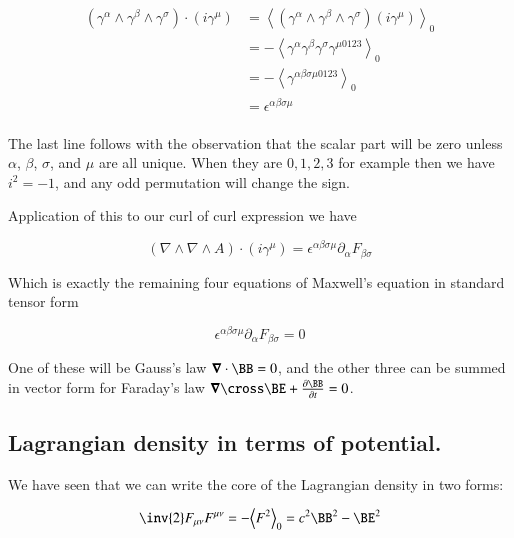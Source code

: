 \documentclass{article}
\newcommand{\gpgrade}[2] {{\left\langle{{#1}}\right\rangle}_{#2}}
\newcommand{\gpgradezero}[1] {\gpgrade{#1}{0}}
\newcommand{\grad}[0]{\nabla}
\newcommand{\spacegrad}[0]{\boldsymbol{\nabla}}
\newcommand{\PD}[2]{\frac{\partial {#2}}{\partial {#1}}}
\begin{document}
\begin{align*}
(\gamma^{\alpha} \wedge \gamma^{\beta} \wedge \gamma^{\sigma}) \cdot ( i \gamma^{\mu} )
&= \gpgradezero{ (\gamma^{\alpha} \wedge \gamma^{\beta} \wedge \gamma^{\sigma}) ( i \gamma^{\mu} ) } \\
&= -\gpgradezero{ \gamma^{\alpha} \gamma^{\beta} \gamma^{\sigma} \gamma^{\mu 0123} } \\
&= -\gpgradezero{ \gamma^{\alpha \beta \sigma \mu 0123} } \\
&= \epsilon^{ \alpha \beta \sigma \mu } \\
\end{align*}

The last line follows with the observation that the scalar part will be zero unless $\alpha$, $\beta$, $\sigma$, and $\mu$ are all unique.  When they are $0,1,2,3$ for example then we have $i^2 = -1$, and any odd permutation will change the sign.


Application of this to our curl of curl expression we have

\begin{equation*}
(\grad \wedge \grad \wedge A) \cdot (i \gamma^{\mu} ) = \epsilon^{ \alpha \beta \sigma \mu } \partial_{\alpha} F_{\beta\sigma}
\end{equation*}

Which is exactly the remaining four equations of Maxwell's equation in standard tensor form

\begin{equation}
\epsilon^{ \alpha \beta \sigma \mu } \partial_{\alpha} F_{\beta\sigma} = 0
\end{equation}

One of these will be Gauss's law $\spacegrad \cdot \BB = 0$, and the other three can be summed in vector form for Faraday's law $\spacegrad \cross \BE + \PD{t}{\BB} = 0$.

\subsection{ Lagrangian density in terms of potential. }

We have seen that we can write the core of the Lagrangian density in two forms:

\begin{equation*}
\inv{2} F_{\mu\nu}F^{\mu\nu} = -\gpgradezero{F^2} = c^2 \BB^2 -\BE^2
\end{equation*}
\end{document}

